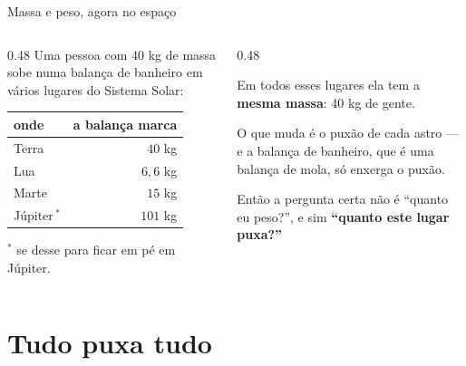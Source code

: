 \documentclass[aspectratio=169,11pt]{beamer}
\newcommand{\bnum}[1]{\textbf{\textcolor{mTeal}{#1}}}
\begin{document}
\begin{frame}{Massa e peso, agora no espaço}
  \begin{columns}[T]
    \begin{column}{0.48\textwidth}
      Uma pessoa com 40 kg de massa sobe numa balança de banheiro em vários lugares do
      Sistema Solar:
      \par\medskip
      \centering
      \small
      \renewcommand{\arraystretch}{1.3}
      \begin{tabular}{lr}
        \toprule
        onde & a balança marca \\
        \midrule
        Terra & $40$ kg \\
        Lua & $6{,}6$ kg \\
        Marte & $15$ kg \\
        Júpiter\,$^{*}$ & \alert{$101$ kg} \\
        \bottomrule
      \end{tabular}

      {\scriptsize\textcolor{mStoneMid}{$^{*}$ se desse para ficar em pé em Júpiter.}}
    \end{column}
    \begin{column}{0.48\textwidth}
      \begin{ideia}[title={A mesma pessoa em todo lugar}]
        Em todos esses lugares ela tem a \bnum{mesma massa}: 40 kg de gente.
        \medskip

        O que muda é o \alert{puxão} de cada astro --- e a balança de banheiro, que é uma
        balança de mola, só enxerga o puxão.
      \end{ideia}
      \medskip

      Então a pergunta certa não é ``quanto eu peso?'', e sim \bnum{``quanto este lugar
      puxa?''}
    \end{column}
  \end{columns}
\end{frame}

\section{Tudo puxa tudo}
\end{document}
